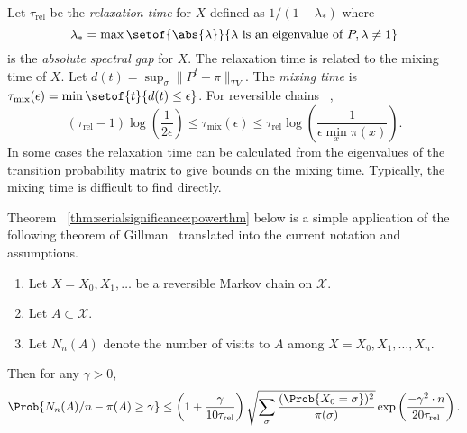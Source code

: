 \documentclass[12pt]{article}
\begin{document}
\begin{example}
\begin{remark}
    Let \( \tau_{\text{rel}} \) be the \emph{relaxation time}%
    for \( X \) defined as \( 1/ (1-\lambda_*) \) where
    \[
        \lambda_* = \max \setof{\abs{\lambda}}{ \lambda \text{ is an
        eigenvalue of } P, \lambda \ne 1 }
    \] is the \emph{absolute spectral gap} for \( X \).  The relaxation
    time is related to the mixing time of \( X \).  Let \( d(t) = \sup_{\sigma}
    \| P^t - \pi \|_{TV} \).  The \emph{mixing time} is \( \tau_{\text{mix}}
    (\epsilon) = \min\setof{t}{d(t) \le \epsilon} \). For reversible
    chains~%
    \cite[Theorems 12.3, 12.4]{levin09},
    \[
        (\tau_{\text{rel}}-1) \log \left( \frac{1}{2\epsilon} \right)
        \le \tau_{\text{mix}}(\epsilon) \le \tau_{\text{rel}} \log \left
        ( \frac{1} {\epsilon \min_x \pi(x)} \right).
    \] In some cases the relaxation time can be calculated from the
    eigenvalues of the transition probability matrix to give bounds on
    the mixing time.  Typically, the mixing time is difficult to find
    directly.
\end{remark}

Theorem~%
\ref{thm:serialsignificance:powerthm} below is a simple application of
the following theorem of Gillman~%
\cite[Theorem 2.1]{gillman98} translated into the current notation and
assumptions.

\begin{theorem}
    \label{thm:serialsignificance:gillman}
    \begin{enumerate}
        \item
            Let \( X = X_0, X_1, \dots \) be a reversible Markov chain
            on \( \mathcal{X} \).
        \item
            Let \( A \subset \mathcal{X} \).
        \item
            Let \( N_n(A) \) denote the number of visits to \( A \)
            among \( X = X_0, X_1, \dots, X_n \).
    \end{enumerate}
    Then for any \( \gamma > 0 \),
    \[
        \Prob{N_n(A)/n - \pi(A) \ge \gamma} \le \left( 1 + \frac{\gamma}
        {10 \tau_{\text{rel}}} \right) \sqrt{\sum_{\sigma} \frac{(\Prob{X_0
        = \sigma})^2}{\pi (\sigma)}} \exp \left( \frac{-\gamma^2 \cdot n}
        {20 \tau_{\text{rel}}} \right).
    \]
\end{theorem}


\end{example}
\end{document}
